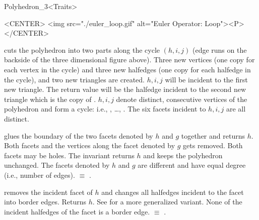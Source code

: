 \begin{ccRefClass}{Polyhedron_3<Traits>}
\begin{ccHtmlOnly}
    <CENTER>
    <img src="./euler_loop.gif" alt="Euler Operator: Loop"><P>
    </CENTER>
\end{ccHtmlOnly}

   {cuts the polyhedron into two parts along the cycle $(h,i,j)$ (edge 
    runs on the backside of the three dimensional figure above).
    Three new vertices (one copy for each vertex in the cycle) and three 
    new halfedges (one copy for each halfedge in the cycle), and two new 
    triangles are created. $h,i,j$ will be incident to the first new triangle.
    The return value will be the halfedge incident to the second new triangle 
    which is the copy of .
    \ccPrecond $h,i,j$ denote distinct, consecutive vertices of the
    polyhedron and form a cycle: i.e., , \ldots, . The six facets incident to $h,i,j$ are all
    distinct.
}

   {glues the boundary of the two facets denoted by $h$ and $g$ together 
    and returns $h$. Both facets and the vertices along the facet denoted
    by $g$ gets removed. Both facets may be holes. The invariant 
     returns $h$ and keeps the 
    polyhedron unchanged.
    \ccPrecond The facets denoted by $h$ and $g$ are different and have
    equal degree (i.e., number of edges).
      $\equiv$ 
    .}


    {removes the incident facet of $h$ and changes all halfedges incident 
    to the facet into border edges. Returns $h$. 
    See  for a more generalized variant.    
    \ccPrecond None of the incident halfedges of the facet is a border edge.
      $\equiv$ 
    .}



\end{ccRefClass}
